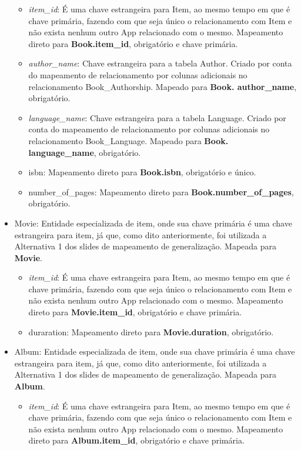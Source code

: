 \documentclass[a4paper, 11pt]{article}
\begin{document}
\begin{itemize}
    \begin{itemize}
        \item {\textit{item\_id}}: É uma chave estrangeira para Item, ao mesmo tempo em que é chave primária, fazendo com que seja único o relacionamento com Item e não exista nenhum outro App relacionado com o mesmo. Mapeamento direto para {\textbf{Book.item\_id}}, obrigatório e chave primária.
        \item {\textit{author\_name}}: Chave estrangeira para a tabela Author. Criado por conta do mapeamento de relacionamento por colunas adicionais no relacionamento Book\_Authorship. Mapeado para {\textbf{Book. author\_name}}, obrigatório.
        \item {\textit{language\_name}}: Chave estrangeira para a tabela Language. Criado por conta do mapeamento de relacionamento por colunas adicionais no relacionamento Book\_Language. Mapeado para {\textbf{Book. language\_name}}, obrigatório.
        \item isbn: Mapeamento direto para {\textbf{Book.isbn}}, obrigatório e único.
        \item number\_of\_pages: Mapeamento direto para {\textbf{Book.number\_of\_pages}}, obrigatório.
    \end{itemize}
    \item Movie: Entidade especializada de item, onde sua chave primária é uma chave estrangeira para item, já que, como dito anteriormente, foi utilizada a Alternativa 1 dos slides de mapeamento de generalização. Mapeada para {\textbf{Movie}}.
    \begin{itemize}
        \item {\textit{item\_id}}: É uma chave estrangeira para Item, ao mesmo tempo em que é chave primária, fazendo com que seja único o relacionamento com Item e não exista nenhum outro App relacionado com o mesmo. Mapeamento direto para {\textbf{Movie.item\_id}}, obrigatório e chave primária.
        \item duraration: Mapeamento direto para {\textbf{Movie.duration}}, obrigatório.
    \end{itemize}
    \item Album: Entidade especializada de item, onde sua chave primária é uma chave estrangeira para item, já que, como dito anteriormente, foi utilizada a Alternativa 1 dos slides de mapeamento de generalização. Mapeada para {\textbf{Album}}.
    \begin{itemize}
        \item {\textit{item\_id}}: É uma chave estrangeira para Item, ao mesmo tempo em que é chave primária, fazendo com que seja único o relacionamento com Item e não exista nenhum outro App relacionado com o mesmo. Mapeamento direto para {\textbf{Album.item\_id}}, obrigatório e chave primária.

\end{itemize}
\end{itemize}
\end{document}
